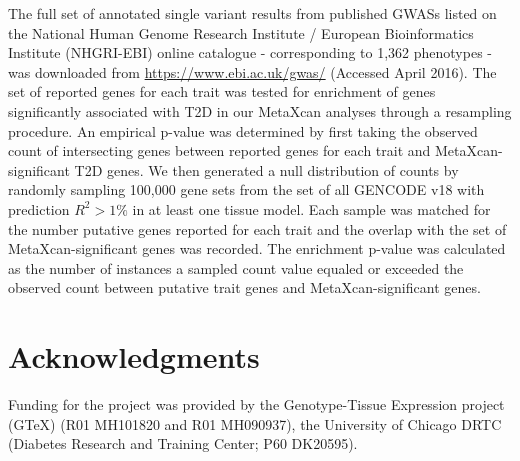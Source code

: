\documentclass[10pt]{article}
\begin{document}
The full set of annotated single variant results from published GWASs listed on the National Human Genome Research Institute / European Bioinformatics Institute (NHGRI-EBI) online catalogue - corresponding to 1,362 phenotypes - was downloaded from \url{https://www.ebi.ac.uk/gwas/} (Accessed April 2016). The set of reported genes for each trait was tested for enrichment of genes significantly associated with T2D in our MetaXcan analyses through a resampling procedure. An empirical p-value was determined by first taking the observed count of intersecting genes between reported genes for each trait and MetaXcan-significant T2D genes. We then generated a null distribution of counts by randomly sampling 100,000 gene sets from the set of all GENCODE v18 \cite{Harrow2012} with prediction $R^{2} > 1\%$ in at least one tissue model. Each sample was matched for the number putative genes reported for each trait and the overlap with the set of MetaXcan-significant genes was recorded. The enrichment p-value was calculated as the number of instances a sampled count value equaled or exceeded the observed count between putative trait genes and MetaXcan-significant genes.  
%
%
%


\section*{Acknowledgments}

Funding for the project was provided by the Genotype-Tissue Expression project (GTeX) (R01 MH101820 and R01 MH090937),
the University of Chicago DRTC (Diabetes Research and Training Center; P60 DK20595). 



% 

%
\end{document}
